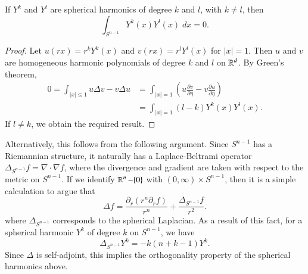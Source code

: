 \begin{theorem}
    If $Y^k$ and $Y^l$ are spherical harmonics of degree $k$ and $l$, with $k \neq l$, then
    \[ \int_{S^{n-1}} Y^k(x) Y^l(x)\; dx = 0. \]
\end{theorem}
\begin{proof}
    Let $u(rx) = r^k Y^k(x)$ and $v(rx) = r^l Y^l(x)$ for $|x| = 1$. Then $u$ and $v$ are homogeneous harmonic polynomials of degree $k$ and $l$ on $\operatorname{\mathbb{R}}^d$. By Green's theorem,
    \begin{align*}
        0 = \int_{|x| \leq 1} u \Delta v - v \Delta u &= \int_{|x| = 1} \left( u \frac{\partial v}{\partial \eta} - v \frac{\partial u}{\partial \eta} \right)\\
        &= \int_{|x| = 1} (l - k) Y^k(x) Y^l(x).
    \end{align*}
    If $l \neq k$, we obtain the required result.
\end{proof}

Alternatively, this follows from the following argument. Since $S^{n-1}$ has a Riemannian structure, it naturally has a Laplace-Beltrami operator $\Delta_{S^{n-1}} f = \nabla \cdot \nabla f$, where the divergence and gradient are taken with respect to the metric on $S^{n-1}$. If we identify $\operatorname{\mathbb{R}}^n - \{ 0 \}$ with $(0,\infty) \times S^{n-1}$, then it is a simple calculation to argue that
%
\[ \Delta f = \frac{\partial_r \left( r^n \partial_r f \right)}{r^n} + \frac{\Delta_{S^{n-1}} f}{r^2}. \]
%
where $\Delta_{S^{n-1}}$ corresponds to the spherical Laplacian. As a result of this fact, for a spherical harmonic $Y^k$ of degree $k$ on $S^{n-1}$, we have
%
\[ \Delta_{S^{n-1}} Y^k = - k (n+k-1) Y^k. \]
%
Since $\Delta$ is self-adjoint, this implies the orthogonality property of the spherical harmonics above.

